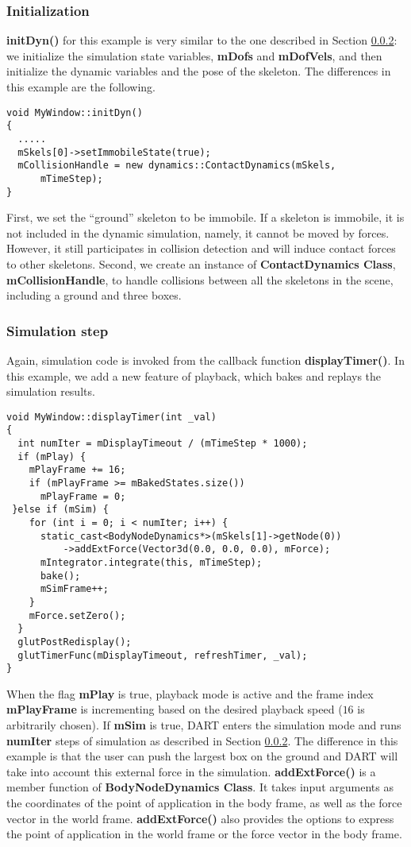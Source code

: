 \subsubsection{Initialization}
\textbf{initDyn()} for this example is very similar to the one
described in Section \ref{}: we initialize the simulation state variables, \textbf{mDofs} and
\textbf{mDofVels}, and then initialize the dynamic variables and the
pose of the skeleton. The differences in this example are the following.
\ttfamily
\begin{lstlisting}[caption=MyWindow.cpp]
void MyWindow::initDyn()
{
  .....
  mSkels[0]->setImmobileState(true);
  mCollisionHandle = new dynamics::ContactDynamics(mSkels, 
      mTimeStep);
}
\end{lstlisting}
\rmfamily First, we set the ``ground'' skeleton to be immobile. If a
skeleton is immobile, it is not included in the dynamic simulation,
namely, it cannot be moved by forces. However, it still participates
in collision detection and will induce contact forces to other
skeletons. Second, we create an instance of \textbf{ContactDynamics
  Class}, \textbf{mCollisionHandle}, to handle collisions between all the
skeletons in the scene, including a ground and three boxes.

\subsubsection{Simulation step}
Again, simulation code is invoked from the callback function
\textbf{displayTimer()}. In this example, we add a new feature of
playback, which bakes and replays the simulation results.

\ttfamily
\begin{lstlisting}[caption=MyWindow.cpp]
void MyWindow::displayTimer(int _val)
{
  int numIter = mDisplayTimeout / (mTimeStep * 1000);
  if (mPlay) {
    mPlayFrame += 16;
    if (mPlayFrame >= mBakedStates.size())
      mPlayFrame = 0;
 }else if (mSim) {
    for (int i = 0; i < numIter; i++) {
      static_cast<BodyNodeDynamics*>(mSkels[1]->getNode(0))
          ->addExtForce(Vector3d(0.0, 0.0, 0.0), mForce);
      mIntegrator.integrate(this, mTimeStep);
      bake();
      mSimFrame++;
    }
    mForce.setZero();
  }
  glutPostRedisplay();
  glutTimerFunc(mDisplayTimeout, refreshTimer, _val);
}
\end{lstlisting}
\rmfamily When the flag \textbf{mPlay} is true, playback mode is
active and the frame index \textbf{mPlayFrame} is incrementing based
on the desired playback speed ($16$ is arbitrarily chosen). If
\textbf{mSim} is true, DART enters the simulation mode and runs
\textbf{numIter} steps of simulation as described in Section
\ref{}. The difference in this example is that the user can push the
largest box on the ground and DART will take into account this
external force in the simulation. \textbf{addExtForce()} is a member
function of \textbf{BodyNodeDynamics Class}. It takes input arguments
as the coordinates of the point of application in the body frame, as
well as the force vector in the world frame. \textbf{addExtForce()}
also provides the options to express the point of application in the
world frame or the force vector in the body frame.

